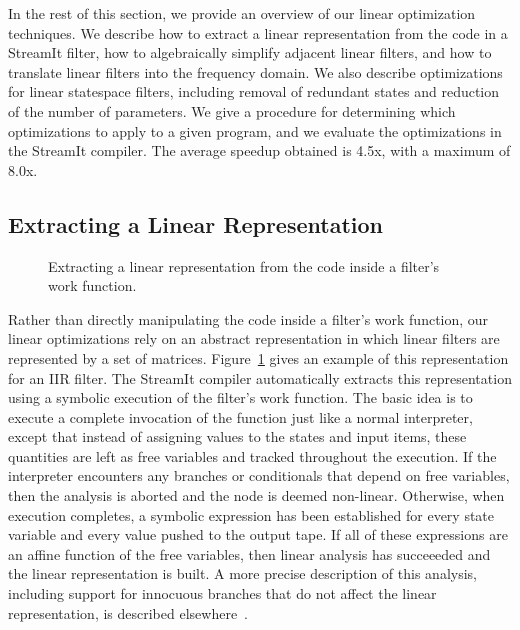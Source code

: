 In the rest of this section, we provide an overview of our linear
optimization techniques.  We describe how to extract a linear
representation from the code in a StreamIt filter, how to
algebraically simplify adjacent linear filters, and how to translate
linear filters into the frequency domain.  We also describe
optimizations for linear statespace filters, including removal of
redundant states and reduction of the number of parameters.  We give a
procedure for determining which optimizations to apply to a given
program, and we evaluate the optimizations in the StreamIt compiler.
The average speedup obtained is 4.5x, with a maximum of 8.0x.

\subsection*{Extracting a Linear Representation}

\begin{figure}[t]
\caption[Extracting a linear representation]{Extracting a linear
  representation from the code inside a filter's work
  function.\protect\label{fig:extraction}}
\end{figure}

Rather than directly manipulating the code inside a filter's work
function, our linear optimizations rely on an abstract representation
in which linear filters are represented by a set of matrices.
Figure~\ref{fig:extraction} gives an example of this representation
for an IIR filter.  The StreamIt compiler automatically extracts this
representation using a symbolic execution of the filter's work
function.  The basic idea is to execute a complete invocation of the
function just like a normal interpreter, except that instead of
assigning values to the states and input items, these quantities are
left as free variables and tracked throughout the execution.  If the
interpreter encounters any branches or conditionals that depend on
free variables, then the analysis is aborted and the node is deemed
non-linear.  Otherwise, when execution completes, a symbolic
expression has been established for every state variable and every
value pushed to the output tape.  If all of these expressions are an
affine function of the free variables, then linear analysis has
succeeeded and the linear representation is built.  A more precise
description of this analysis, including support for innocuous branches
that do not affect the linear representation, is described
elsewhere~\cite{streamit-linear}.

